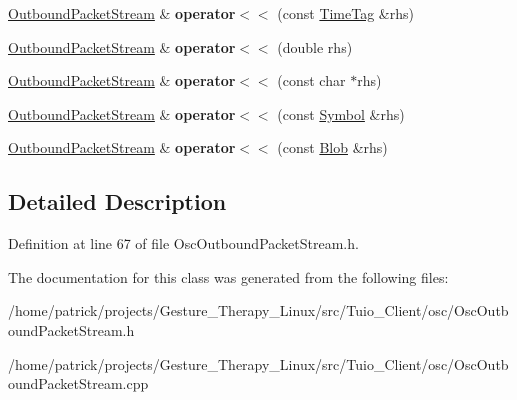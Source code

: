 \begin{DoxyCompactItemize}
\hyperlink{classosc_1_1_outbound_packet_stream}{Outbound\+Packet\+Stream} \& {\bfseries operator$<$$<$} (const \hyperlink{structosc_1_1_time_tag}{Time\+Tag} \&rhs)
\item 
\mbox{\label{classosc_1_1_outbound_packet_stream_a6f57f187947013425f380b0d4638df76}} 
\hyperlink{classosc_1_1_outbound_packet_stream}{Outbound\+Packet\+Stream} \& {\bfseries operator$<$$<$} (double rhs)
\item 
\mbox{\label{classosc_1_1_outbound_packet_stream_adaf8af6da2a34b867e1f14ddac41551c}} 
\hyperlink{classosc_1_1_outbound_packet_stream}{Outbound\+Packet\+Stream} \& {\bfseries operator$<$$<$} (const char $\ast$rhs)
\item 
\mbox{\label{classosc_1_1_outbound_packet_stream_a2b9bf271bb9f901b5bef6443b812b76e}} 
\hyperlink{classosc_1_1_outbound_packet_stream}{Outbound\+Packet\+Stream} \& {\bfseries operator$<$$<$} (const \hyperlink{structosc_1_1_symbol}{Symbol} \&rhs)
\item 
\mbox{\label{classosc_1_1_outbound_packet_stream_adc2a4bfa7b09d66e617a05d2c3cdb675}} 
\hyperlink{classosc_1_1_outbound_packet_stream}{Outbound\+Packet\+Stream} \& {\bfseries operator$<$$<$} (const \hyperlink{structosc_1_1_blob}{Blob} \&rhs)
\end{DoxyCompactItemize}


\subsection{Detailed Description}


Definition at line 67 of file Osc\+Outbound\+Packet\+Stream.\+h.



The documentation for this class was generated from the following files\+:\begin{DoxyCompactItemize}
\item 
/home/patrick/projects/\+Gesture\+\_\+\+Therapy\+\_\+\+Linux/src/\+Tuio\+\_\+\+Client/osc/Osc\+Outbound\+Packet\+Stream.\+h\item 
/home/patrick/projects/\+Gesture\+\_\+\+Therapy\+\_\+\+Linux/src/\+Tuio\+\_\+\+Client/osc/Osc\+Outbound\+Packet\+Stream.\+cpp\end{DoxyCompactItemize}
